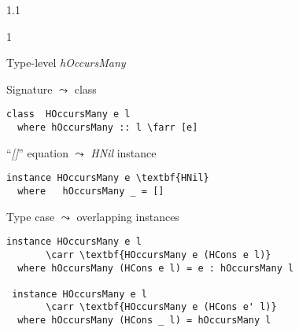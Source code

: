 \documentclass{slides}
\newenvironment{myslide}{\begin{slide}\color{Blue}\begin{boxedminipage}{1.1\hsize}\begin{boxedminipage}{1\hsize}\color{Black}
\vspace{-170\in}
}{%
\smallskip
\end{boxedminipage}
\end{boxedminipage}
\end{slide}}
\newenvironment{myslide}{\begin{slide}
}{%
\end{slide}}
\newenvironment{myslide}{\begin{slide}\color{White}\begin{boxedminipage}{1.1\hsize}\color{Black}
\vspace{-170\in}
}{%
\smallskip
\end{boxedminipage}
\end{slide}}
\newcommand{\header}[1]{{\large \color{Red} #1}}
\newcommand{\blau}[1]{{\vspace{-50\in}\normalsize \color{Blue} #1}}
\newcommand{\farr}{\ensuremath{\to}}
\newcommand{\carr}{\ensuremath{\Rightarrow}}
\begin{document}
\begin{myslide}

\header{Type-level \emph{hOccursMany}}

\vspace{-77\in}

\blau{Signature $\leadsto$ class}

\smallskip

\begin{Verbatim}[fontfamily=courier,fontsize=\small,commandchars=\\\{\}]
 class  HOccursMany e l
  where hOccursMany :: l \farr [e]
\end{Verbatim}

\vspace{-77\in}

\blau{``\emph{[]}'' equation $\leadsto$ \emph{HNil} instance}

\smallskip

\begin{Verbatim}[fontfamily=courier,fontsize=\small,commandchars=\\\{\}]
 instance HOccursMany e \textbf{HNil}
  where   hOccursMany _ = []
\end{Verbatim}

\vspace{-77\in}

\blau{Type case $\leadsto$ overlapping instances}

\smallskip

\begin{Verbatim}[fontfamily=courier,fontsize=\small,commandchars=\\\{\}]
 instance HOccursMany e l
       \carr \textbf{HOccursMany e (HCons e l)}
  where hOccursMany (HCons e l) = e : hOccursMany l

 instance HOccursMany e l
       \carr \textbf{HOccursMany e (HCons e' l)}
  where hOccursMany (HCons _ l) = hOccursMany l
\end{Verbatim}

\end{myslide}



\end{document}
